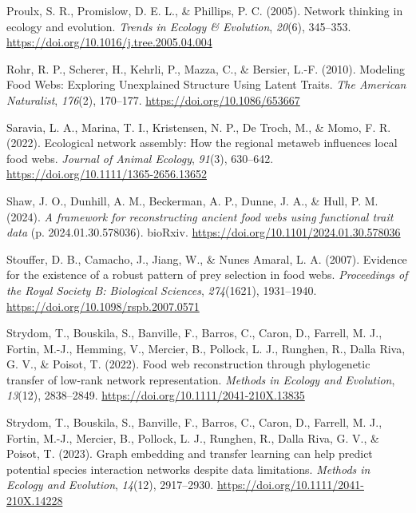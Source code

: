 \documentclass[
]{article}
\newlength{\cslhangindent}
\newenvironment{CSLReferences}[2] %
 {\begin{list}{}{%
  \setlength{\itemindent}{0pt}
  \setlength{\leftmargin}{0pt}
  \setlength{\parsep}{0pt}
  \ifodd #1
   \setlength{\leftmargin}{\cslhangindent}
   \setlength{\itemindent}{-1\cslhangindent}
  \fi
  \setlength{\itemsep}{#2\baselineskip}}}
 {\end{list}}
\begin{document}
\begin{CSLReferences}{1}{0}
Proulx, S. R., Promislow, D. E. L., \& Phillips, P. C. (2005). Network
thinking in ecology and evolution. \emph{Trends in Ecology \&
Evolution}, \emph{20}(6), 345--353.
\url{https://doi.org/10.1016/j.tree.2005.04.004}

Rohr, R. P., Scherer, H., Kehrli, P., Mazza, C., \& Bersier, L.-F.
(2010). Modeling {Food Webs}: {Exploring Unexplained Structure Using
Latent Traits}. \emph{The American Naturalist}, \emph{176}(2), 170--177.
\url{https://doi.org/10.1086/653667}

Saravia, L. A., Marina, T. I., Kristensen, N. P., De Troch, M., \& Momo,
F. R. (2022). Ecological network assembly: {How} the regional metaweb
influences local food webs. \emph{Journal of Animal Ecology},
\emph{91}(3), 630--642. \url{https://doi.org/10.1111/1365-2656.13652}

Shaw, J. O., Dunhill, A. M., Beckerman, A. P., Dunne, J. A., \& Hull, P.
M. (2024). \emph{A framework for reconstructing ancient food webs using
functional trait data} (p. 2024.01.30.578036). bioRxiv.
\url{https://doi.org/10.1101/2024.01.30.578036}

Stouffer, D. B., Camacho, J., Jiang, W., \& Nunes Amaral, L. A. (2007).
Evidence for the existence of a robust pattern of prey selection in food
webs. \emph{Proceedings of the Royal Society B: Biological Sciences},
\emph{274}(1621), 1931--1940.
\url{https://doi.org/10.1098/rspb.2007.0571}

Strydom, T., Bouskila, S., Banville, F., Barros, C., Caron, D., Farrell,
M. J., Fortin, M.-J., Hemming, V., Mercier, B., Pollock, L. J., Runghen,
R., Dalla Riva, G. V., \& Poisot, T. (2022). Food web reconstruction
through phylogenetic transfer of low-rank network representation.
\emph{Methods in Ecology and Evolution}, \emph{13}(12), 2838--2849.
\url{https://doi.org/10.1111/2041-210X.13835}

Strydom, T., Bouskila, S., Banville, F., Barros, C., Caron, D., Farrell,
M. J., Fortin, M.-J., Mercier, B., Pollock, L. J., Runghen, R., Dalla
Riva, G. V., \& Poisot, T. (2023). Graph embedding and transfer learning
can help predict potential species interaction networks despite data
limitations. \emph{Methods in Ecology and Evolution}, \emph{14}(12),
2917--2930. \url{https://doi.org/10.1111/2041-210X.14228}


\end{CSLReferences}
\end{document}
